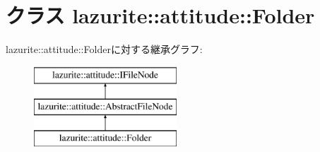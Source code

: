 \hypertarget{classlazurite_1_1attitude_1_1_folder}{
\section{クラス lazurite::attitude::Folder}
\label{classlazurite_1_1attitude_1_1_folder}
}
lazurite::attitude::Folderに対する継承グラフ:\begin{figure}[H]
\begin{center}
\leavevmode
\includegraphics[height=3cm]{classlazurite_1_1attitude_1_1_folder}
\end{center}
\end{figure}
